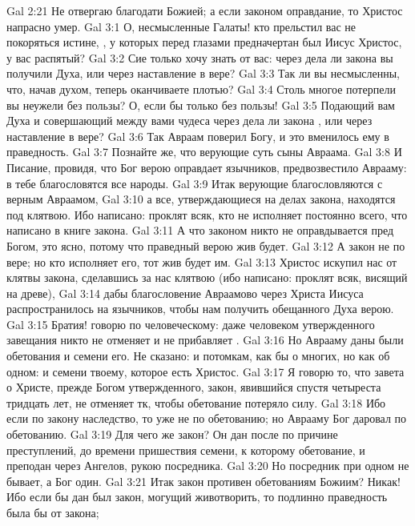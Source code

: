 \vs Gal 2:21 Не отвергаю благодати Божией; а если законом оправдание, то Христос напрасно умер.
\vs Gal 3:1 О, несмысленные Галаты! кто прельстил вас не покоряться истине, , у которых перед глазами предначертан был Иисус Христос,  у вас распятый?
\vs Gal 3:2 Сие только хочу знать от вас: через дела ли закона вы получили Духа, или через наставление в вере?
\vs Gal 3:3 Так ли вы несмысленны, что, начав духом, теперь оканчиваете плотью?
\vs Gal 3:4 Столь многое потерпели вы неужели без пользы? О, если бы только без пользы!
\vs Gal 3:5 Подающий вам Духа и совершающий между вами чудеса через дела ли закона , или через наставление в вере?
\vs Gal 3:6 Так Авраам поверил Богу, и это вменилось ему в праведность.
\vs Gal 3:7 Познайте же, что верующие суть сыны Авраама.
\vs Gal 3:8 И Писание, провидя, что Бог верою оправдает язычников, предвозвестило Аврааму: в тебе благословятся все народы.
\vs Gal 3:9 Итак верующие благословляются с верным Авраамом,
\vs Gal 3:10 а все, утверждающиеся на делах закона, находятся под клятвою. Ибо написано: проклят всяк, кто не исполняет постоянно всего, что написано в книге закона.
\vs Gal 3:11 А что законом никто не оправдывается пред Богом, это ясно, потому что праведный верою жив будет.
\vs Gal 3:12 А закон не по вере; но кто исполняет его, тот жив будет им.
\vs Gal 3:13 Христос искупил нас от клятвы закона, сделавшись за нас клятвою (ибо написано: проклят всяк, висящий на древе),
\vs Gal 3:14 дабы благословение Авраамово через Христа Иисуса распространилось на язычников, чтобы нам получить обещанного Духа верою.
\rsbpar\vs Gal 3:15 Братия! говорю по  человеческому: даже человеком утвержденного завещания никто не отменяет и не прибавляет .
\vs Gal 3:16 Но Аврааму даны были обетования и семени его. Не сказано: и потомкам, как бы о многих, но как об одном: и семени твоему, которое есть Христос.
\vs Gal 3:17 Я говорю то, что завета о Христе, прежде Богом утвержденного, закон, явившийся спустя четыреста тридцать лет, не отменяет тк, чтобы обетование потеряло силу.
\vs Gal 3:18 Ибо если по закону наследство, то уже не по обетованию; но Аврааму Бог даровал  по обетованию.
\rsbpar\vs Gal 3:19 Для чего же закон? Он дан после по причине преступлений, до времени пришествия семени, к которому  обетование, и преподан через Ангелов, рукою посредника.
\vs Gal 3:20 Но посредник при одном не бывает, а Бог один.
\vs Gal 3:21 Итак закон противен обетованиям Божиим? Никак! Ибо если бы дан был закон, могущий животворить, то подлинно праведность была бы от закона;
